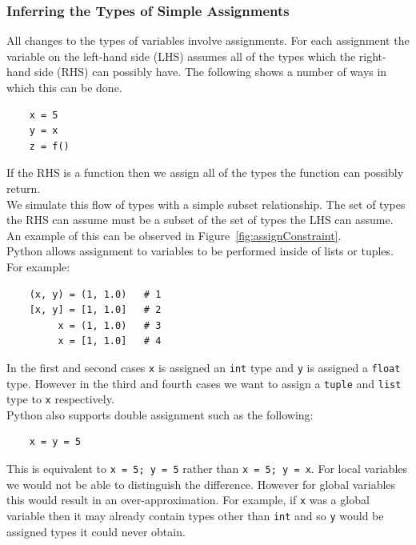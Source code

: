 \documentclass[12pt, titlepage]{article}
\begin{document}
\subsubsection{Inferring the Types of Simple Assignments}
All changes to the types of variables involve assignments. For each assignment the variable on the left-hand side (LHS) assumes all of the types which the right-hand side (RHS) can possibly have. The following shows a number of ways in which this can be done.
\begin{lstlisting}
	x = 5
	y = x
	z = f()
\end{lstlisting}
 If the RHS is a function then we assign all of the types the function can possibly return. \\
\indent We simulate this flow of types with a simple subset relationship. The set of types the RHS can assume must be a subset of the set of types the LHS can assume. An example of this can be observed in Figure~\ref{fig:assignConstraint}. \\
\indent Python allows assignment to variables to be performed inside of lists or tuples. For example:
\begin{lstlisting}
    (x, y) = (1, 1.0)   # 1
    [x, y] = [1, 1.0]   # 2
         x = (1, 1.0)   # 3
         x = [1, 1.0]   # 4
\end{lstlisting}
In the first and second cases \texttt{x} is assigned an \texttt{int} type and \texttt{y} is assigned a \texttt{float} type. However in the third and fourth cases we want to assign a \texttt{tuple} and \texttt{list} type to \texttt{x} respectively. \\
Python also supports double assignment such as the following:
\begin{lstlisting}
    x = y = 5
\end{lstlisting}
This is equivalent to \texttt{x = 5; y = 5} rather than \texttt{x = 5; y = x}. For local variables we would not be able to distinguish the difference. However for global variables this would result in an over-approximation. For example, if \texttt{x} was a global variable then it may already contain types other than \texttt{int} and so \texttt{y} would be assigned types it could never obtain.
\end{document}
